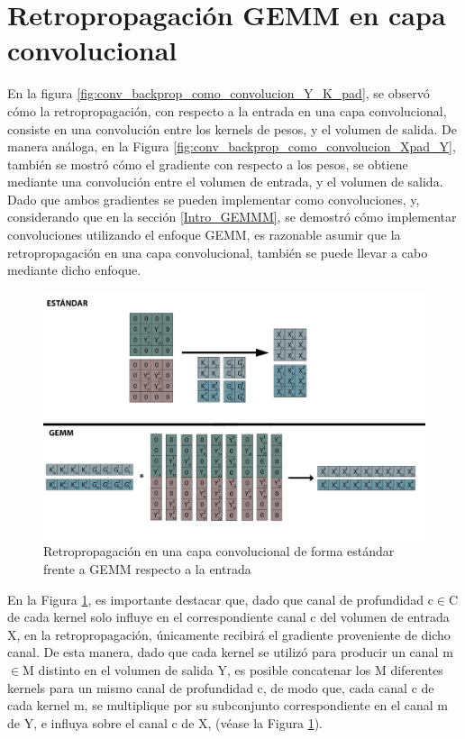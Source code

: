\section{Retropropagación GEMM en capa convolucional}

En la figura \ref{fig:conv_backprop_como_convolucion_Y_K_pad}, se observó cómo la retropropagación, con respecto a la entrada en una capa convolucional, consiste en una convolución entre los kernels de pesos, y el volumen de salida. De manera análoga, en la Figura \ref{fig:conv_backprop_como_convolucion_Xpad_Y}, también se mostró cómo el gradiente con respecto a los pesos, se obtiene mediante una convolución entre el volumen de entrada, y el volumen de salida. \\
Dado que ambos gradientes se pueden implementar como convoluciones, y, considerando que en la sección \ref{Intro_GEMMM}, se demostró cómo implementar convoluciones utilizando el enfoque GEMM, es razonable asumir que la retropropagación en una capa convolucional, también se puede llevar a cabo mediante dicho enfoque.

\begin{figure}[H]
	\hspace{-38mm}
	\includegraphics[scale=0.3]{imagenes/conv_std_vs_gemm_backprop.jpg}  
	\caption{Retropropagación en una capa convolucional de forma estándar frente a GEMM respecto a la entrada}
	\label{fig:conv_std_vs_gemm_backprop}
\end{figure}

En la Figura \ref{fig:conv_std_vs_gemm_backprop}, es importante destacar que, dado que canal de profundidad c$\in$C de cada kernel solo influye en el correspondiente canal c del volumen de entrada X, en la retropropagación, únicamente recibirá el gradiente proveniente de dicho canal. De esta manera, dado que cada kernel se utilizó para producir un canal m$\in$M distinto en el volumen de salida Y, es posible concatenar los M diferentes kernels para un mismo canal de profundidad c, de modo que, cada canal c de cada kernel m, se multiplique por su subconjunto correspondiente en el canal m de Y, e influya sobre el canal c de X, (véase la Figura \ref{fig:conv_std_vs_gemm_backprop}). 

